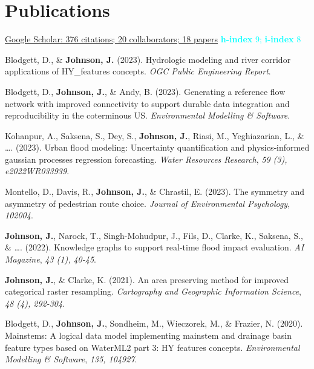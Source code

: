 \documentclass[11pt,a4paper,]{awesome-cv}
\begin{document}
\hypertarget{publications}{%
\section{Publications}\label{publications}}

\textcolor{cyan}{ \href{https://tinyurl.com/mike-google-scholar}{ Google Scholar: 376 citations;  20 collaborators;  18 papers} \newline
\textbf{h-index} 9; \textbf{i-index} 8}

\hypertarget{bibliography}{}
\leavevmode{}%
Blodgett, D., \& \textbf{Johnson, J.} (2023). Hydrologic modeling and
river corridor applications of HY\_features concepts. \emph{OGC Public
Engineering Report}.

\leavevmode{}%
Blodgett, D., \textbf{Johnson, J.}, \& Andy, B. (2023). Generating a
reference flow network with improved connectivity to support durable
data integration and reproducibility in the coterminous US.
\emph{Environmental Modelling \& Software}.

\leavevmode{}%
Kohanpur, A., Saksena, S., Dey, S., \textbf{Johnson, J.}, Riasi, M.,
Yeghiazarian, L., \& \ldots. (2023). Urban flood modeling: Uncertainty
quantification and physics‐informed gaussian processes regression
forecasting. \emph{Water Resources Research}, \emph{59 (3),
e2022WR033939}.

\leavevmode{}%
Montello, D., Davis, R., \textbf{Johnson, J.}, \& Chrastil, E. (2023).
The symmetry and asymmetry of pedestrian route choice. \emph{Journal of
Environmental Psychology}, \emph{102004}.

\leavevmode{}%
\textbf{Johnson, J.}, Narock, T., Singh-Mohudpur, J., Fils, D., Clarke,
K., Saksena, S., \& \ldots. (2022). Knowledge graphs to support
real-time flood impact evaluation. \emph{AI Magazine}, \emph{43 (1),
40-45}.

\leavevmode{}%
\textbf{Johnson, J.}, \& Clarke, K. (2021). An area preserving method
for improved categorical raster resampling. \emph{Cartography and
Geographic Information Science}, \emph{48 (4), 292-304}.

\leavevmode{}%
Blodgett, D., \textbf{Johnson, J.}, Sondheim, M., Wieczorek, M., \&
Frazier, N. (2020). Mainstems: A logical data model implementing
mainstem and drainage basin feature types based on WaterML2 part 3: HY
features concepts. \emph{Environmental Modelling \& Software},
\emph{135, 104927}.
\end{document}
